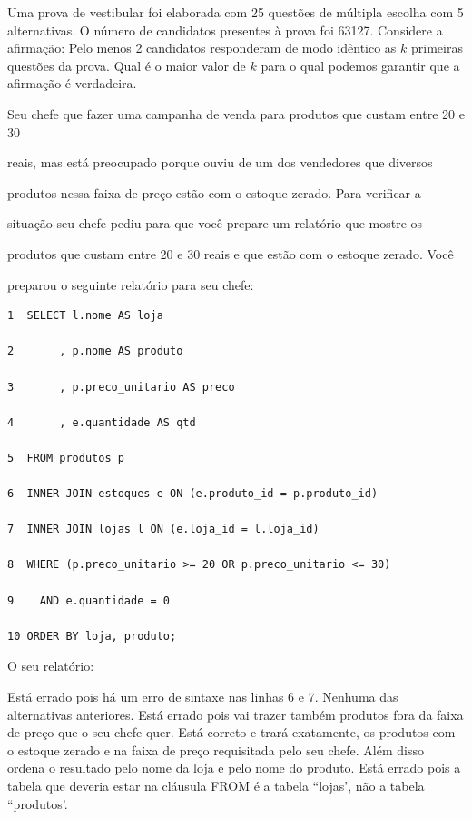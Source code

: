 \documentclass[12pt, addpoints]{exam}
\begin{document}
\begin{questions}
Uma prova de vestibular foi elaborada com 25 questões de múltipla escolha com 5 alternativas. O número de candidatos presentes à prova foi 63127. Considere a afirmação: Pelo menos 2 candidatos responderam de modo idêntico as \( k \) primeiras questões da prova. Qual é o maior valor de \( k \) para o qual podemos garantir que a afirmação é verdadeira.


\begin{choices}
\end{choices}

\question

Seu chefe que fazer uma campanha de venda para produtos que custam entre 20 e 30

reais, mas está preocupado porque ouviu de um dos vendedores que diversos

produtos nessa faixa de preço estão com o estoque zerado. Para verificar a

situação seu chefe pediu para que você prepare um relatório que mostre os

produtos que custam entre 20 e 30 reais e que estão com o estoque zerado. Você

preparou o seguinte relatório para seu chefe:

\begin{tcolorbox}

 \begin{verbatim}1  SELECT l.nome AS loja

2       , p.nome AS produto

3       , p.preco_unitario AS preco

4       , e.quantidade AS qtd

5  FROM produtos p

6  INNER JOIN estoques e ON (e.produto_id = p.produto_id)

7  INNER JOIN lojas l ON (e.loja_id = l.loja_id)

8  WHERE (p.preco_unitario >= 20 OR p.preco_unitario <= 30)

9    AND e.quantidade = 0

10 ORDER BY loja, produto;

 \end{verbatim}

\end{tcolorbox}

O seu relatório:
\begin{choices}
\choice Está errado pois há um erro de sintaxe nas linhas 6 e 7.
\choice Nenhuma das alternativas anteriores.
\choice Está errado pois vai trazer também produtos fora da faixa de preço que o seu chefe quer.
\choice Está correto e trará exatamente, os produtos com o estoque zerado e na faixa de preço requisitada pelo seu chefe. Além disso ordena o resultado pelo nome da loja e pelo nome do produto.
\choice Está errado pois a tabela que deveria estar na cláusula FROM é a tabela ``lojas', não a tabela ``produtos'.
\end{choices}


\end{questions}
\end{document}
